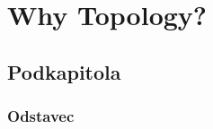 \chapter{Why Topology?}


\shorthandoff{-} 

\section{Podkapitola}

\subsection{Odstavec}

\lipsum[140-145]
\shorthandon{-} 
